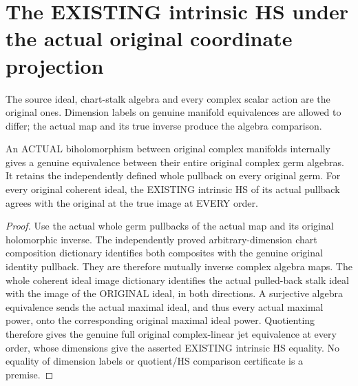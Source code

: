 \section{The EXISTING intrinsic HS under the actual original coordinate projection}

The source ideal, chart-stalk algebra and every complex scalar action are the
original ones. Dimension labels on genuine manifold equivalences are allowed
to differ; the actual map and its true inverse produce the algebra comparison.

\begin{lemma}
\label{hir:actual-cross-dimension-biholomorphic-intrinsic-hs}
\leanok
An ACTUAL biholomorphism between original complex manifolds internally gives
a genuine equivalence between their entire original complex germ algebras.
It retains the independently defined whole pullback on every original germ.
For every original coherent ideal, the EXISTING intrinsic HS of its actual
pullback agrees with the original at the true image at EVERY order.
\end{lemma}
\begin{proof}
Use the actual whole germ pullbacks of the actual map and its original
holomorphic inverse. The independently proved arbitrary-dimension chart
composition dictionary identifies both composites with the genuine original
identity pullback. They are therefore mutually inverse complex algebra maps.
The whole coherent ideal image dictionary identifies the actual pulled-back
stalk ideal with the image of the ORIGINAL ideal, in both directions. A
surjective algebra equivalence sends the actual maximal ideal, and thus
every actual maximal power, onto the corresponding original maximal ideal
power. Quotienting therefore gives the genuine full original complex-linear
jet equivalence at every order, whose dimensions give the asserted EXISTING
intrinsic HS equality. No equality of dimension labels or quotient/HS
comparison certificate is a premise.
\end{proof}

